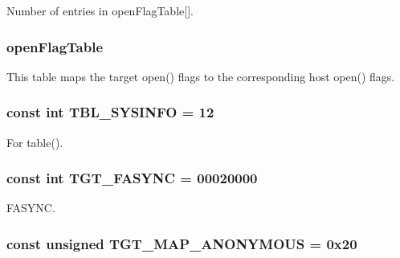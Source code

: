 Number of entries in openFlagTable\mbox{[}\mbox{]}. \hypertarget{classArmLinux32_ab1db5a531609b99b262cc849ea24765a}{
\subsubsection[{openFlagTable}]{ {\bf openFlagTable}}}
\label{classArmLinux32_ab1db5a531609b99b262cc849ea24765a}
This table maps the target open() flags to the corresponding host open() flags. \hypertarget{classArmLinux32_a02a979126f2aa34bcdfdc6ab92207d3b}{
\subsubsection[{TBL\_\-SYSINFO}]{\setlength{\rightskip}{0pt plus 5cm}const int {\bf TBL\_\-SYSINFO} = 12}}
\label{classArmLinux32_a02a979126f2aa34bcdfdc6ab92207d3b}


For table(). \hypertarget{classArmLinux32_ab23d73086673a1279fc508b68fc47191}{
\subsubsection[{TGT\_\-FASYNC}]{\setlength{\rightskip}{0pt plus 5cm}const int {\bf TGT\_\-FASYNC} = 00020000}}
\label{classArmLinux32_ab23d73086673a1279fc508b68fc47191}


FASYNC. \hypertarget{classArmLinux32_a0bbc267200567dd98250b99b6085a499}{
\subsubsection[{TGT\_\-MAP\_\-ANONYMOUS}]{\setlength{\rightskip}{0pt plus 5cm}const unsigned {\bf TGT\_\-MAP\_\-ANONYMOUS} = 0x20}}
\label{classArmLinux32_a0bbc267200567dd98250b99b6085a499}


